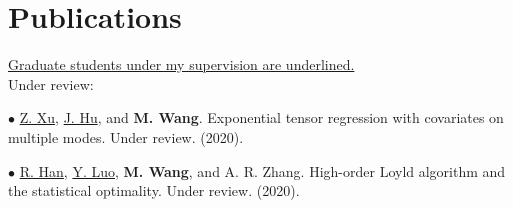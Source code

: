 \documentclass[letterpaper]{article}
\renewenvironment{itemize}{
  \begin{list}{}{
    \setlength{\leftmargin}{1.5em}
  }
}{
  \end{list}
}
\begin{document}
\section*{Publications}

\underline{Graduate students under my supervision are underlined.}\\

Under review:
\begin{itemize}

\item$\bullet$  \underline{Z. Xu}, \underline{J. Hu}, and {\bf M. Wang}. Exponential tensor regression with covariates on multiple modes. Under review. (2020). 

\item$\bullet$  \underline{R. Han}, \underline{Y. Luo}, {\bf M. Wang}, and A. R. Zhang. High-order Loyld algorithm and the statistical optimality. Under review. (2020). 
\end{itemize}
\end{document}
